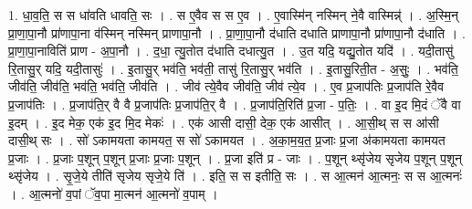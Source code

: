 \documentclass[17pt]{extarticle}
\begin{document}
1. धा॒व॒ति॒ स स धा॑वति धावति॒ सः । . स ए॒वैव स स ए॒व । . ए॒वास्मि॑न् नस्मिन् ने॒वै वास्मिन्न्॑ । . अ॒स्मि॒न् प्रा॒णा॒पा॒नौ प्रा॑णापा॒ना व॑स्मिन् नस्मिन् प्राणापा॒नौ । . प्रा॒णा॒पा॒नौ द॑धाति दधाति प्राणापा॒नौ प्रा॑णापा॒नौ द॑धाति । . प्रा॒णा॒पा॒नाविति॑ प्राण - अ॒पा॒नौ । . द॒धा॒ त्यु॒तोत द॑धाति दधात्यु॒त । . उ॒त यदि॒ यद्यु॒तोत यदि॑ । . यदी॒तासु॑ रि॒तासु॒र् यदि॒ यदी॒तासुः॑ । . इ॒तासु॒र् भव॑ति॒ भव॑ती॒ तासु॑ रि॒तासु॒र् भव॑ति । . इ॒तासु॒रिती॒त - अ॒सुः॒ । . भव॑ति॒ जीव॑ति॒ जीव॑ति॒ भव॑ति॒ भव॑ति॒ जीव॑ति । . जीव॑ त्ये॒वैव जीव॑ति॒ जीव॑ त्ये॒व । . ए॒व प्र॒जाप॑तिः प्र॒जाप॑ति रे॒वैव प्र॒जाप॑तिः । . प्र॒जाप॑ति॒र् वै वै प्र॒जाप॑तिः प्र॒जाप॑ति॒र् वै । . प्र॒जाप॑ति॒रिति॑ प्र॒जा - प॒तिः॒ । . वा इ॒द मि॒दं ॅवै वा इ॒दम् । . इ॒द मेक॒ एक॑ इ॒द मि॒द मेकः॑ । . एक॑ आसी दासी॒ देक॒ एक॑ आसीत् । . आ॒सी॒थ् स स आ॑सी दासी॒थ् सः । . सो॑ ऽकामयता कामयत॒ स सो॑ ऽकामयत । . अ॒का॒म॒य॒त॒ प्र॒जाः प्र॒जा अ॑कामयता कामयत प्र॒जाः । . प्र॒जाः प॒शून् प॒शून् प्र॒जाः प्र॒जाः प॒शून् । . प्र॒जा इति॑ प्र - जाः । . प॒शून् थ्सृ॑जेय सृजेय प॒शून् प॒शून् थ्सृ॑जेय । . सृ॒जे॒ये तीति॑ सृजेय सृजे॒ये ति॑ । . इति॒ स स इतीति॒ सः । . स आ॒त्मन॑ आ॒त्मनः॒ स स आ॒त्मनः॑ । . आ॒त्मनो॑ व॒पां ॅव॒पा मा॒त्मन॑ आ॒त्मनो॑ व॒पाम् । \newline
\end{document}
